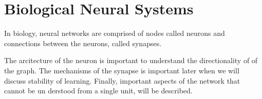 










\section{Biological Neural Systems} 
\label{secTheBiologicalNeuralSystem}
In biology, neural networks are comprised of nodes called neurons and connections between the neurons, called synapses. 

The arcitecture of the neuron is important to understand the directionality of of the graph. %
	The mechanisms of the synapse is important later when we will discuss stability of learning. 
Finally, important aspects of the network that cannot be un derstood from a single unit, will be described.

